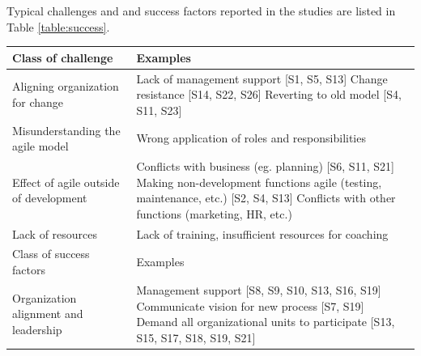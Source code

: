 \documentclass[lnbip]{svmultln}
\begin{document}
Typical challenges and and success factors reported in the studies are listed in
Table \ref{table:success}.


\begin{table}[h]
    \begin{tabular}{ p{} p{} }
        \toprule
        Class of challenge  & Examples   \\ \midrule
        
        \raggedright Aligning organization for change  &
             Lack of management support [S1, S5, S13]\newline
             Change resistance [S14, S22, S26] \newline
             Reverting to old model [S4, S11, S23] \\ 
        
        \raggedright\rule{0pt}{0.4cm}Misunderstanding the agile model  &
             Wrong application of roles and responsibilities \newline
             [S6, S10, S11, S13, S17, S23, S24] \\
        
        \raggedright\rule{0pt}{0.4cm}Effect of agile outside of development  &
            Conflicts with business (eg. planning) [S6, S11, S21] \newline
            Making non-development functions agile (testing, maintenance, etc.) [S2, S4, S13]\newline
            Conflicts with other functions (marketing, HR, etc.) \newline[S6, S10, S11, S13] \\
        
        \raggedright\rule{0pt}{0.4cm}Lack of resources  &
            Lack of training, insufficient resources for coaching \newline
            [S5, S13, S22, S28]\\
        
        \midrule
        Class of success factors  & Examples   \\ \midrule
        
        \raggedright Organization alignment and leadership  &
             Management support [S8, S9, S10, S13, S16, S19] \newline
             Communicate vision for new process [S7, S19] \newline
             Demand all organizational units to participate [S13, S15, S17, S18, S19, S21] \\ 
        

\end{tabular}
\end{table}
\end{document}
